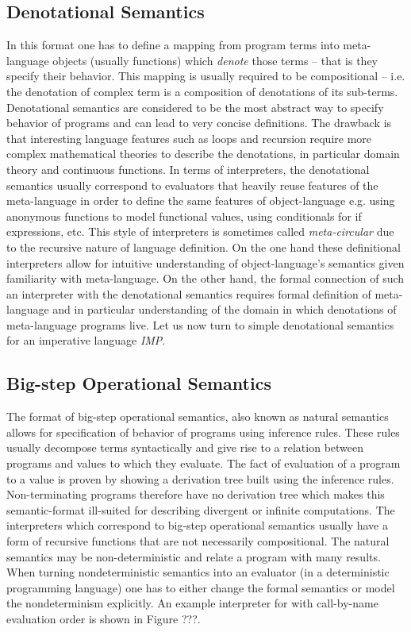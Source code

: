 \subsection*{Denotational Semantics}
In this format one has to define a mapping from program terms into meta-language objects (usually functions) which \emph{denote} those terms -- that is they specify their behavior.
This mapping is usually required to be compositional -- i.e. the denotation of complex term is a composition of denotations of its sub-terms.
Denotational semantics are considered to be the most abstract way to specify behavior of programs and can lead to very concise definitions.
The drawback is that interesting language features such as loops and recursion require more complex mathematical theories to describe the denotations, in particular domain theory and continuous functions.
In terms of interpreters, the denotational semantics usually correspond to evaluators that heavily reuse features of the meta-language in order to define the same features of object-language e.g. using anonymous functions to model functional values, using conditionals for if expressions, etc.
This style of interpreters is sometimes called \textit{meta-circular} due to the recursive nature of language definition.
On the one hand these definitional interpreters allow for intuitive understanding of object-language's semantics given familiarity with meta-language.
On the other hand, the formal connection of such an interpreter with the denotational semantics requires formal definition of meta-language and in particular understanding of the domain in which denotations of meta-language programs live.
Let us now turn to simple denotational semantics for an imperative language \textit{IMP}.

\subsection*{Big-step Operational Semantics}
The format of big-step operational semantics, also known as natural semantics allows for specification of behavior of programs using inference rules.
These rules usually decompose terms syntactically and give rise to a relation between programs and values to which they evaluate.
The fact of evaluation of a program to a value is proven by showing a derivation tree built using the inference rules.
Non-terminating programs therefore have no derivation tree which makes this semantic-format ill-suited for describing divergent or infinite computations.
The interpreters which correspond to big-step operational semantics usually have a form of recursive functions that are not necessarily compositional.
The natural semantics may be non-deterministic and relate a program with many results.
When turning nondeterministic semantics into an evaluator (in a deterministic programming language) one has to either change the formal semantics or model the nondeterminism explicitly.
An example interpreter for \LC{} with call-by-name evaluation order is shown in Figure ???.


